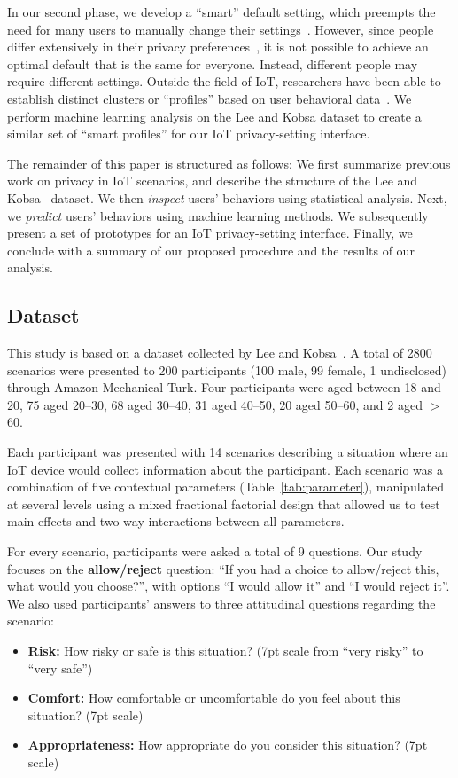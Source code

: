 In our second phase, we develop a ``smart'' default setting, which preempts the need for many users to manually change their settings~\cite{smith2013choice}. However, since people differ extensively in their privacy preferences~\cite{olson2005study}, it is not possible to achieve an optimal default that is the same for everyone. Instead, different people may require different settings. Outside the field of IoT, researchers have been able to establish distinct clusters or ``profiles'' based on user behavioral data~\cite{knijnenburg2013dimensionality, olson2005study, wisniewski2017making}. We perform machine learning analysis on the Lee and Kobsa dataset to create a similar set of ``smart profiles'' for our IoT privacy-setting interface.

The remainder of this paper is structured as follows: We first summarize previous work on privacy in IoT scenarios, and describe the structure of the Lee and Kobsa~\cite{lee2016understanding} dataset. We then \emph{inspect} users' behaviors using statistical analysis. Next, we \emph{predict} users' behaviors using machine learning methods. We subsequently present a set of prototypes for an IoT privacy-setting interface. Finally, we conclude with a summary of our proposed procedure and the results of our analysis.

\subsection{Dataset}
This study is based on a dataset collected by Lee and Kobsa~\cite{lee2016understanding}. A total of 2800 scenarios were presented to 200 participants (100 male, 99 female, 1 undisclosed) through Amazon Mechanical Turk. Four participants were aged between 18 and 20, 75 aged 20--30, 68 aged 30--40, 31 aged 40--50, 20 aged 50--60, and 2 aged $>$ 60. 

Each participant was presented with 14 scenarios describing a situation where an IoT device would collect information about the participant. Each scenario was a combination of five contextual parameters (Table~\ref{tab:parameter}), manipulated at several levels using a mixed fractional factorial design that allowed us to test main effects and two-way interactions between all parameters.

For every scenario, participants were asked a total of 9 questions. Our study focuses on the \textbf{allow/reject} question: ``If you had a choice to allow/reject this, what would you choose?'', with options ``I would allow it'' and ``I would reject it''. We also used participants' answers to three attitudinal questions regarding the scenario:
\begin{itemize}
	\item \textbf{Risk:} How risky or safe is this situation? (7pt scale from ``very risky'' to ``very safe'')
	\item \textbf{Comfort:} How comfortable or uncomfortable do you feel about this situation? (7pt scale)
	\item \textbf{Appropriateness:} How appropriate do you consider this situation? (7pt scale)
\end{itemize}

